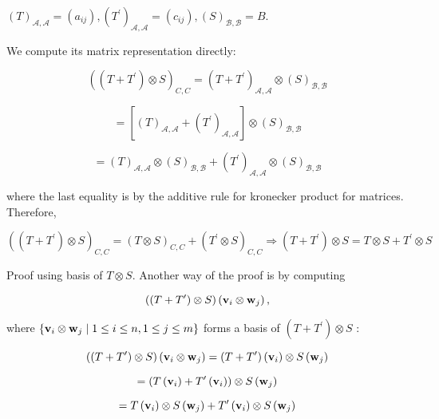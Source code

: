 \documentclass[11pt]{article}
\begin{document}
\({\left( T\right) }_{\mathcal{A},\mathcal{A}} = \left( {a}_{ij}\right) ,{\left( {T}^{\prime }\right) }_{\mathcal{A},\mathcal{A}} = \left( {c}_{ij}\right) ,{\left( S\right) }_{\mathcal{B},\mathcal{B}} = B.\)

We compute its matrix representation directly:

\[
{\left( \left( T + {T}^{\prime }\right)  \otimes  S\right) }_{C,C} = {\left( T + {T}^{\prime }\right) }_{\mathcal{A},\mathcal{A}} \otimes  {\left( S\right) }_{\mathcal{B},\mathcal{B}}
\]

\[
= \left\lbrack  {{\left( T\right) }_{\mathcal{A},\mathcal{A}} + {\left( {T}^{\prime }\right) }_{\mathcal{A},\mathcal{A}}}\right\rbrack   \otimes  {\left( S\right) }_{\mathcal{B},\mathcal{B}}
\]

\[
= {\left( T\right) }_{\mathcal{A},\mathcal{A}} \otimes  {\left( S\right) }_{\mathcal{B},\mathcal{B}} + {\left( {T}^{\prime }\right) }_{\mathcal{A},\mathcal{A}} \otimes  {\left( S\right) }_{\mathcal{B},\mathcal{B}}
\]

where the last equality is by the additive rule for kronecker product for matrices. Therefore,

\[
{\left( \left( T + {T}^{\prime }\right)  \otimes  S\right) }_{C,C} = {\left( T \otimes  S\right) }_{C,C} + {\left( {T}^{\prime } \otimes  S\right) }_{C,C} \Rightarrow  \left( {T + {T}^{\prime }}\right)  \otimes  S = T \otimes  S + {T}^{\prime } \otimes  S
\]

Proof using basis of \(T \otimes  S\). Another way of the proof is by computing

\[
\left( {\left( {T + {T}^{\prime }}\right)  \otimes  S}\right) \left( {{\bf v}_{i} \otimes  {\bf w}_{j}}\right) ,
\]

where \(\left\{  {{\bf v}_{i} \otimes  {\bf w}_{j} \mid  1 \leq  i \leq  n,1 \leq  j \leq  m}\right\}\) forms a basis of \(\left( {T + {T}^{\prime }}\right)  \otimes  S\) :

\[
\left( {\left( {T + {T}^{\prime }}\right)  \otimes  S}\right) \left( {{\bf v}_{i} \otimes  {\bf w}_{j}}\right)  = \left( {T + {T}^{\prime }}\right) \left( {\bf v}_{i}\right)  \otimes  S\left( {\bf w}_{j}\right)
\]

\[
= \left( {T\left( {\bf v}_{i}\right)  + {T}^{\prime }\left( {\bf v}_{i}\right) }\right)  \otimes  S\left( {\bf w}_{j}\right)
\]

\[
= T\left( {\bf v}_{i}\right)  \otimes  S\left( {\bf w}_{j}\right)  + {T}^{\prime }\left( {\bf v}_{i}\right)  \otimes  S\left( {\bf w}_{j}\right)
\]
\end{document}

